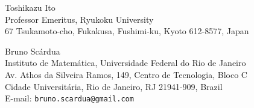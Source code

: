 \documentclass[11pt,reqno]{article}
\theoremstyle{remark}
\begin{document}
\bigskip
\noindent
Toshikazu Ito\\
Professor Emeritus, Ryukoku University\\
67 Tsukamoto-cho, Fukakusa, Fushimi-ku, Kyoto 612-8577, Japan

\medskip
\noindent
Bruno Sc\'ardua\\
Instituto de Matem\'atica, Universidade Federal do Rio de Janeiro\\
Av. Athos da Silveira Ramos, 149, Centro de Tecnologia, Bloco C\\
Cidade Universit\'aria, Rio de Janeiro, RJ 21941-909, Brazil\\
E-mail: \texttt{bruno.scardua@gmail.com}
\end{document}

